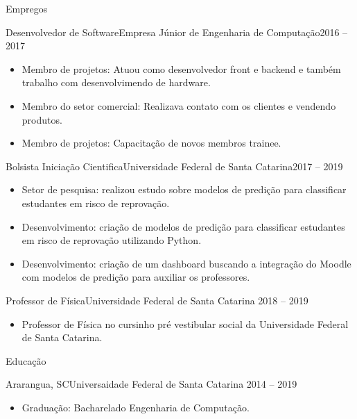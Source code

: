 \documentclass[]{mcdowellcv}
\begin{document}
	\makeheader
	
	\begin{cvsection}{Empregos}
		\begin{cvsubsection}{Desenvolvedor de Software}{Empresa Júnior de Engenharia de Computação}{2016 -- 2017}
			~\\
			\begin{itemize}
				\item Membro de projetos: Atuou como desenvolvedor front e backend e também trabalho com desenvolvimendo de hardware.
				\item Membro do setor comercial: Realizava contato com os clientes e vendendo produtos.
				\item Membro de projetos: Capacitação de novos membros trainee.
			\end{itemize}
		\end{cvsubsection}
		
		\begin{cvsubsection}{Bolsista Iniciação Cientifica}{Universidade Federal de Santa Catarina}{2017 -- 2019}
			~\\
			\begin{itemize}
				\item Setor de pesquisa: realizou estudo sobre modelos de predição para classificar estudantes em risco de reprovação.
				\item Desenvolvimento: criação de modelos de predição para classificar estudantes em risco de reprovação utilizando Python.
				\item Desenvolvimento: criação de um dashboard buscando a integração do Moodle com modelos de predição para auxiliar os professores.
			\end{itemize}
		\end{cvsubsection}
		
		\begin{cvsubsection}{Professor de Física}{Universidade Federal de Santa Catarina}{ 2018 -- 2019}	
			~\\			
			\begin{itemize}
				\item Professor de Física no cursinho pré vestibular social da Universidade Federal de Santa Catarina.
			\end{itemize}
		\end{cvsubsection}
		
		
	\end{cvsection}
	
	\begin{cvsection}{Educação}
		\begin{cvsubsection}{Ararangua, SC}{Universaidade Federal de Santa Catarina}{ 2014 -- 2019}
			~\\
			\begin{itemize}
				\item Graduação: Bacharelado Engenharia de Computação. 
			\end{itemize}
		\end{cvsubsection}
	\end{cvsection}
	
\end{document}
